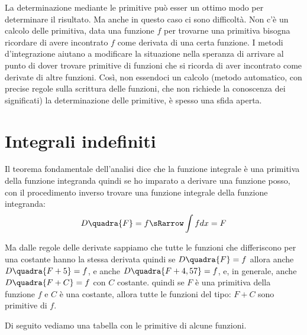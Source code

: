 La determinazione mediante le primitive può esser un ottimo modo per 
determinare il risultato. Ma anche in questo caso ci sono difficoltà. Non c'è 
un calcolo delle primitiva, data una funzione \(f\) per trovarne una 
primitiva bisogna ricordare di avere incontrato \(f\) come derivata di una 
certa funzione. 
I metodi d'integrazione aiutano a modificare la situazione nella speranza di 
arrivare al punto di dover trovare primitive di funzioni che si ricorda di 
aver incontrato come derivate di altre funzioni. Così, non 
essendoci un calcolo (metodo automatico, con precise regole sulla scrittura 
delle funzioni, che non richiede la conoscenza dei significati) la 
determinazione delle primitive, è spesso una sfida aperta.

\section{Integrali indefiniti}
\label{sec:integrali_indefiniti}

Il teorema fondamentale dell'analisi dice che la funzione integrale è una 
primitiva della funzione integranda quindi se ho imparato a derivare una 
funzione posso, con il procedimento inverso trovare una funzione integrale 
della funzione integranda:
\[D \quadra{F} = f \sRarrow \int f dx = F\]

Ma dalle regole delle derivate sappiamo che tutte le funzioni che 
differiscono per una costante hanno la stessa derivata quindi se 
\(D \quadra{F} = f\) allora anche \(D \quadra{F+5} = f\), e anche 
\(D \quadra{F+4,57} = f\), e, in generale, anche \(D \quadra{F+C} = f\) con 
\(C\) costante.
quindi se \(F\) è una primitiva della funzione \(f\) e \(C\) è una 
costante, allora tutte le funzioni del tipo: \(F + C\) sono primitive di 
\(f\).

Di seguito vediamo una tabella con le primitive di alcune funzioni.

